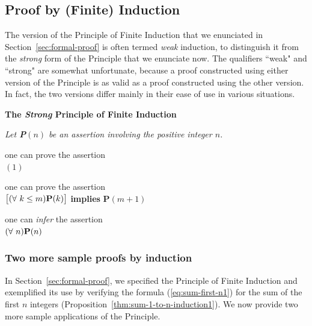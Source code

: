 \subsection{Proof by (Finite) Induction}
\label{sec:Induction}

The version of the Principle of Finite Induction that we enunciated in Section~\ref{sec:formal-proof} is often termed {\em weak} induction, to distinguish it from the {\em strong} form of the Principle that we enunciate now.  The qualifiers ``weak" and ``strong" are somewhat unfortunate, because a proof constructed using either version of the Principle is as valid as a proof constructed using the other version.  In fact, the two versions differ mainly in their ease of use in various situations.

\bigskip

 

\noindent %
\hspace*{.1in}\begin{minipage}{0.95\textwidth}
{\bf The {\em Strong} Principle of Finite Induction}

{\em
Let {\bf P}$(n)$ be an assertion involving the positive integer $n$.

\hspace*{.15in}{\bf if} one can prove the assertion \\
\hspace*{.35in}{\bf P}$(1)$

\hspace*{.15in}{\bf and} one can prove the assertion \\
\hspace*{.35in}$\big[ (\forall \ k \leq m)\mbox{\bf P}(k) \big]$ {\bf implies} {\bf P}$(m+1)$

\hspace*{.15in}{\bf then} one can {\em infer} the assertion \\
\hspace*{.35in}$(\forall \ n) \mbox{\bf P}(n)$
}
\end{minipage} %

\bigskip


\subsubsection{Two more sample proofs by induction}

In Section~\ref{sec:formal-proof}, we specified the Principle of Finite Induction and exemplified its use by verifying the formula (\ref{eq:sum-first-n1}) for the sum of the first $n$ integers
(Proposition~\ref{thm:sum-1-to-n-induction1}).  We now provide two more sample applications of the Principle.

